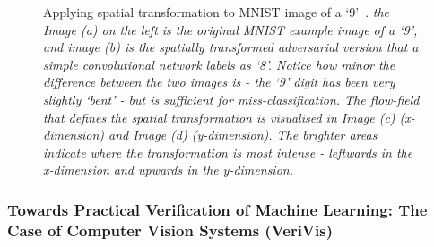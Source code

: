 \begin{figure}[t]
\begin{minipage}{0.24\textwidth}
    \end{minipage}
    \caption{Applying spatial transformation to MNIST image of a `9'~\cite{xiao2018spatially}. {\em the Image (a) on the left is the original MNIST example image of a `9', and image (b) is the spatially transformed adversarial version that a simple convolutional network \cite{papernot2018cleverhans} labels as `8'. Notice how minor the difference between the two images is - the `9' digit has been very slightly `bent' - but is sufficient for miss-classification. The flow-field that defines the spatial transformation is visualised in Image (c) (x-dimension) and Image (d) (y-dimension). The brighter areas indicate where the transformation is most intense - leftwards in the x-dimension and upwards in the y-dimension.}}
    \label{fig:stadvMNIST}
\end{figure}


\subsubsection{Towards Practical Verification of Machine Learning: The Case of Computer Vision Systems (VeriVis)}

